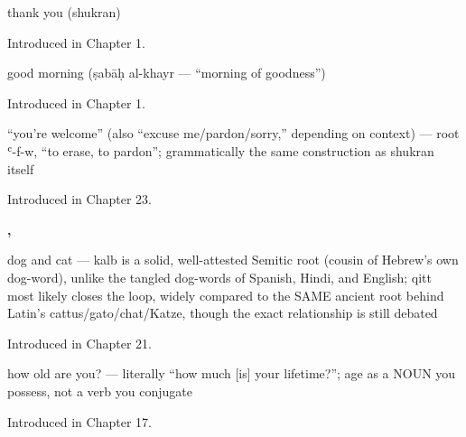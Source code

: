 \noindent\begin{minipage}[t]{\linewidth}
\raggedright
\textbf{}\par
\small thank you (shukran)\par
\footnotesize Introduced in Chapter 1.
\end{minipage}\par\medskip

\noindent\begin{minipage}[t]{\linewidth}
\raggedright
\textbf{ }\par
\small good morning (ṣabāḥ al-khayr — \textquotedblleft{}morning of goodness\textquotedblright{})\par
\footnotesize Introduced in Chapter 1.
\end{minipage}\par\medskip

\noindent\begin{minipage}[t]{\linewidth}
\raggedright
\textbf{}\par
\small \textquotedblleft{}you're welcome\textquotedblright{} (also \textquotedblleft{}excuse me/pardon/sorry,\textquotedblright{} depending on context) — root ʿ-f-w, \textquotedblleft{}to erase, to pardon\textquotedblright{}; grammatically the same construction as shukran itself\par
\footnotesize Introduced in Chapter 23.
\end{minipage}\par\medskip

\noindent\begin{minipage}[t]{\linewidth}
\raggedright
\textbf{, }\par
\small dog and cat — kalb is a solid, well-attested Semitic root (cousin of Hebrew's own dog-word), unlike the tangled dog-words of Spanish, Hindi, and English; qitt most likely closes the loop, widely compared to the SAME ancient root behind Latin's cattus/gato/chat/Katze, though the exact relationship is still debated\par
\footnotesize Introduced in Chapter 21.
\end{minipage}\par\medskip

\noindent\begin{minipage}[t]{\linewidth}
\raggedright
\textbf{ }\par
\small how old are you? — literally \textquotedblleft{}how much {[}is{]} your lifetime?\textquotedblright{}; age as a NOUN you possess, not a verb you conjugate\par
\footnotesize Introduced in Chapter 17.
\end{minipage}\par\medskip

